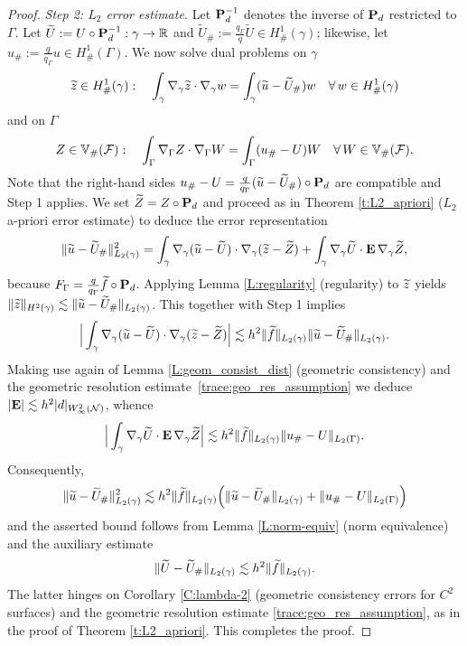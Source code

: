 \begin{proof}
\medskip\noindent
{\it Step 2: $L_2$ error estimate.} Let ${\bf P}_d^{-1}$ denotes the inverse of ${\bf P}_d$ restricted to $\Gamma$. 
Let $\widetilde U:=U\circ{\bf P}_d^{-1}:\gamma\to\mathbb{R}$ and
$\widetilde U_\# := \frac{q_\Gamma}{q}\widetilde U \in H^1_\#(\gamma)$; likewise,
let $u_\# := \frac{q}{q_\Gamma} u \in H^1_\#(\Gamma)$. We now solve dual problems on $\gamma$
%
\[
\widetilde{z}\in H^1_\#(\gamma): \quad
\int_\gamma \nabla_\gamma \widetilde{z} \cdot \nabla_\gamma w = \int_\gamma (\widetilde{u} - \widetilde{U}_\#) w
\quad \forall \, w\in H^1_\#(\gamma)
\]
%
and on $\Gamma$
%
\[
Z\in\mathbb{V}_\#(\mathcal F): \quad
\int_\Gamma \nabla_\Gamma Z \cdot \nabla_\Gamma W = \int_\Gamma (u_\#-U)W
\quad\forall \, W\in\mathbb{V}_\#(\mathcal F).
\]
%
Note that the right-hand sides $u_\#-U = \frac{q}{q_\Gamma}(\widetilde{u} - \widetilde{U}_\#)\circ{\bf P}_d$ are compatible and Step 1 applies.
We set $\widetilde Z = Z \circ {\bf P}_d$ and proceed as in Theorem \ref{t:L2_apriori} ($L_2$ a-priori error estimate) to deduce the error representation
%
\[
\|\widetilde{u}-\widetilde{U}_\#\|_{L_2(\gamma)}^2 =
\int_\gamma \nabla_\gamma (\widetilde{u}-\widetilde U)\cdot\nabla_\gamma(\widetilde z-\widetilde Z)
+ \int_\gamma \nabla_\gamma \widetilde U \cdot {\bf E} \, \nabla_\gamma \widetilde Z,
\]
%
because $F_\Gamma =\frac{q}{q_\Gamma} \widetilde{f} \circ {\bf P}_d $.
Applying Lemma \ref{L:regularity} (regularity) to $\widetilde{z}$ yields $\|\widetilde{z}\|_{H^2(\gamma)} \lesssim \|\widetilde{u}-\widetilde{U}_\#\|_{L_2(\gamma)}$. This together with Step 1 implies
%
\[
\Big| \int_\gamma \nabla_\gamma (\widetilde{u}-\widetilde U)\cdot\nabla_\gamma(\widetilde{z}-\widetilde Z) \Big|
\lesssim h^2 \|\widetilde{f}\|_{L_2(\gamma)} \|\widetilde{u}-\widetilde{U}_\#\|_{L_2(\gamma)}.
\]
%
Making use again of Lemma \ref{L:geom_consist_dist} (geometric consistency) and the geometric resolution estimate~\eqref{trace:geo_res_assumption} we deduce $|{\bf E}| \lesssim h^2 |d|_{W^2_\infty(\mathcal{N})}$, whence
%
\[
\Big| \int_\gamma \nabla_\gamma \widetilde U \cdot {\bf E} \, \nabla_\gamma \widetilde Z  \Big|
\lesssim h^2 \|\widetilde{f}\|_{L_2(\gamma)} \|u_\# -U\|_{L_2(\Gamma)}.
\]
%
Consequently,
%
\[
\|\widetilde{u}-\widetilde{U}_\#\|_{L_2(\gamma)}^2 \lesssim h^2 \|\widetilde{f}\|_{L_2(\gamma)}
\Big(\|\widetilde{u}-\widetilde{U}_\#\|_{L_2(\gamma)} + \|u_\#-U\|_{L_2(\Gamma)} \Big)
\]
%
and the asserted bound follows from Lemma \ref{L:norm-equiv} (norm equivalence)
and the auxiliary estimate
%
\[
\|\widetilde{U}-\widetilde{U}_\#\|_{L_2(\gamma)}
\lesssim
h^2  \|\widetilde{f}\|_{L_2(\gamma)}.
\]
%
The latter hinges on Corollary \ref{C:lambda-2} (geometric consistency errors for $C^2$ surfaces) and the geometric resolution estimate \eqref{trace:geo_res_assumption}, as in the proof of Theorem \ref{t:L2_apriori}. This completes the proof.
\end{proof}

